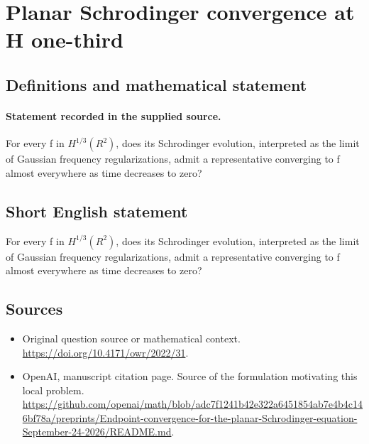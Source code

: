 \documentclass[11pt]{article}
\begin{document}
\section*{Planar Schrodinger convergence at H one-third}\label{30007436}
\subsection{Definitions and mathematical statement}
\paragraph{Statement recorded in the supplied source.}
For every f in $H^{1/3}(R^2)$, does its Schrodinger evolution, interpreted as the limit of Gaussian frequency regularizations, admit a representative converging to f almost everywhere as time decreases to zero?
\subsection{Short English statement}
For every f in $H^{1/3}(R^2)$, does its Schrodinger evolution, interpreted as the limit of Gaussian frequency regularizations, admit a representative converging to f almost everywhere as time decreases to zero?
\subsection{Sources}
\begin{itemize}
\item[S1] Original question source or mathematical context.
\url{https://doi.org/10.4171/owr/2022/31}.
\item[S2] OpenAI, manuscript citation page. Source of the formulation motivating this local problem.
\url{https://github.com/openai/math/blob/adc7f1241b42e322a6451854ab7e4b4c146bf78a/preprints/Endpoint-convergence-for-the-planar-Schrodinger-equation-September-24-2026/README.md}.
\end{itemize}
\end{document}
